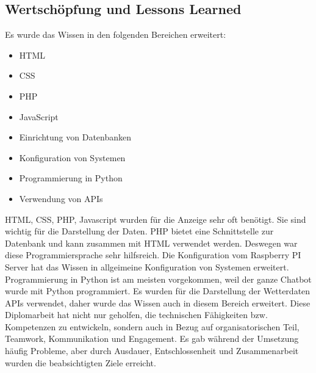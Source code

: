 \subsection{Wertschöpfung und Lessons Learned}
Es wurde das Wissen in den folgenden Bereichen erweitert: \\
\begin{itemize}
	\item HTML
\end{itemize}
\begin{itemize}
	\item CSS
\end{itemize}
\begin{itemize}
	\item PHP
\end{itemize}
\begin{itemize}
	\item JavaScript
\end{itemize}
\begin{itemize}
	\item Einrichtung von Datenbanken
\end{itemize}
\begin{itemize}
	\item Konfiguration von Systemen
\end{itemize} 
\begin{itemize}
	\item Programmierung in Python
\end{itemize}
 \begin{itemize}
 	\item Verwendung von APIs
 \end{itemize}
HTML, CSS, PHP, Javascript wurden f\"ur die Anzeige sehr oft ben\"otigt. Sie sind wichtig f\"ur die Darstellung der Daten. PHP bietet eine Schnittstelle zur Datenbank und kann zusammen mit HTML verwendet werden. Deswegen war diese Programmiersprache sehr hilfsreich. Die Konfiguration vom Raspberry PI Server hat das Wissen in allgeimeine Konfiguration von Systemen erweitert. Programmierung in Python ist am meisten vorgekommen, weil der ganze Chatbot wurde mit Python programmiert. Es wurden f\"ur die Darstellung der Wetterdaten APIs verwendet, daher wurde das Wissen auch in diesem Bereich erweitert. 
Diese Diplomarbeit hat nicht nur geholfen, die technischen Fähigkeiten bzw. Kompetenzen zu entwickeln, sondern auch in Bezug auf organisatorischen Teil, Teamwork, Kommunikation und Engagement. Es gab w\"ahrend der Umsetzung h\"aufig Probleme, aber durch Ausdauer, Entschlossenheit und Zusammenarbeit wurden die beabsichtigten Ziele erreicht. 
\label{\docname}

